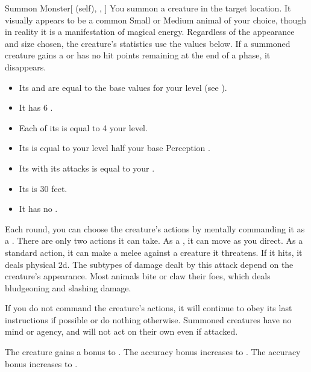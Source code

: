 \lowercase{\hypertarget{spell:Summon Monster}{}}\label{spell:Summon Monster}
\begin{attuneability}[Rank 1]{\hypertarget{spell:Summon Monster}{Summon Monster}}[ (self), , ]
You summon a creature in the target location.
It visually appears to be a common Small or Medium animal of your choice, though in reality it is a manifestation of magical energy.
Regardless of the appearance and size chosen, the creature's statistics use the values below.
If a summoned creature gains a  or has no hit points remaining at the end of a phase, it disappears.

\begin{itemize}
\item Its  and  are equal to the base values for your level (see ).
\item It has 6 .
\item Each of its  is equal to 4 \add your level.
\item Its  is equal to your level \add half your base Perception .
\item Its  with its attacks is equal to your .
\item Its  is 30 feet.
\item It has no .
\end{itemize}

Each round, you can choose the creature's actions by mentally commanding it as a .
There are only two actions it can take.
As a , it can move as you direct.
As a standard action, it can make a melee  against a creature it threatens.
If it hits, it deals physical  \minus2d.
The subtypes of damage dealt by this attack depend on the creature's appearance.
Most animals bite or claw their foes, which deals bludgeoning and slashing damage.

If you do not command the creature's actions, it will continue to obey its last instructions if possible or do nothing otherwise.
Summoned creatures have no mind or agency, and will not act on their own even if attacked.

\rankline
{} The creature gains a  bonus to .
 The accuracy bonus increases to .
 The accuracy bonus increases to .
\end{attuneability}
\vspace{0.25em}



